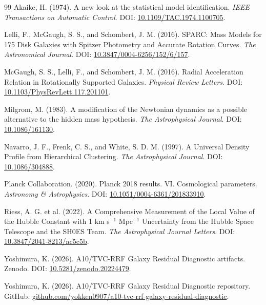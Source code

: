 \documentclass[11pt,a4paper]{article}
\begin{document}
\begin{thebibliography}{99}
Akaike, H. (1974). A new look at the statistical model identification. \emph{IEEE Transactions on Automatic Control}. DOI: \href{https://doi.org/10.1109/TAC.1974.1100705}{10.1109/TAC.1974.1100705}.

Lelli, F., McGaugh, S. S., and Schombert, J. M. (2016). SPARC: Mass Models for 175 Disk Galaxies with Spitzer Photometry and Accurate Rotation Curves. \emph{The Astronomical Journal}. DOI: \href{https://doi.org/10.3847/0004-6256/152/6/157}{10.3847/0004-6256/152/6/157}.

McGaugh, S. S., Lelli, F., and Schombert, J. M. (2016). Radial Acceleration Relation in Rotationally Supported Galaxies. \emph{Physical Review Letters}. DOI: \href{https://doi.org/10.1103/PhysRevLett.117.201101}{10.1103/PhysRevLett.117.201101}.

Milgrom, M. (1983). A modification of the Newtonian dynamics as a possible alternative to the hidden mass hypothesis. \emph{The Astrophysical Journal}. DOI: \href{https://doi.org/10.1086/161130}{10.1086/161130}.

Navarro, J. F., Frenk, C. S., and White, S. D. M. (1997). A Universal Density Profile from Hierarchical Clustering. \emph{The Astrophysical Journal}. DOI: \href{https://doi.org/10.1086/304888}{10.1086/304888}.

Planck Collaboration. (2020). Planck 2018 results. VI. Cosmological parameters. \emph{Astronomy \& Astrophysics}. DOI: \href{https://doi.org/10.1051/0004-6361/201833910}{10.1051/0004-6361/201833910}.

Riess, A. G. et al. (2022). A Comprehensive Measurement of the Local Value of the Hubble Constant with 1 km s$^{-1}$ Mpc$^{-1}$ Uncertainty from the Hubble Space Telescope and the SH0ES Team. \emph{The Astrophysical Journal Letters}. DOI: \href{https://doi.org/10.3847/2041-8213/ac5c5b}{10.3847/2041-8213/ac5c5b}.

Yoshimura, K. (2026). A10/TVC-RRF Galaxy Residual Diagnostic artifacts. Zenodo. DOI: \href{https://doi.org/10.5281/zenodo.20224479}{10.5281/zenodo.20224479}.

Yoshimura, K. (2026). A10/TVC-RRF Galaxy Residual Diagnostic repository. GitHub. \href{https://github.com/yokken0907/a10-tvc-rrf-galaxy-residual-diagnostic}{github.com/yokken0907/a10-tvc-rrf-galaxy-residual-diagnostic}.
\end{thebibliography}
\end{document}
